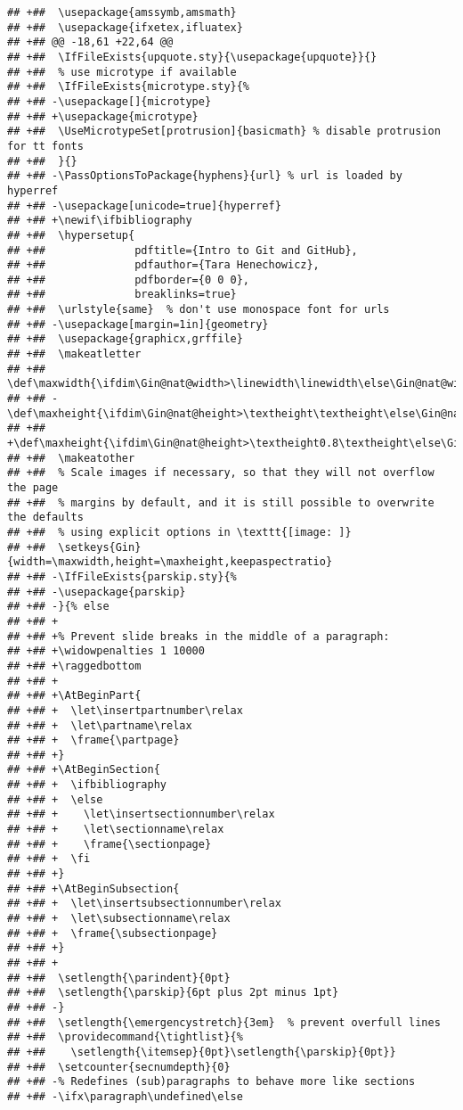 \documentclass[ignorenonframetext,]{beamer}
\newif\ifbibliography
\let\insertpartnumber\relax
\let\partname\relax
\let\insertsectionnumber\relax
\let\sectionname\relax
\let\insertsubsectionnumber\relax
\let\subsectionname\relax
\providecommand{\tightlist}{%
  \setlength{\itemsep}{0pt}\setlength{\parskip}{0pt}}
\begin{document}
\begin{verbatim}
## +##  \usepackage{amssymb,amsmath}
## +##  \usepackage{ifxetex,ifluatex}
## +## @@ -18,61 +22,64 @@
## +##  \IfFileExists{upquote.sty}{\usepackage{upquote}}{}
## +##  % use microtype if available
## +##  \IfFileExists{microtype.sty}{%
## +## -\usepackage[]{microtype}
## +## +\usepackage{microtype}
## +##  \UseMicrotypeSet[protrusion]{basicmath} % disable protrusion for tt fonts
## +##  }{}
## +## -\PassOptionsToPackage{hyphens}{url} % url is loaded by hyperref
## +## -\usepackage[unicode=true]{hyperref}
## +## +\newif\ifbibliography
## +##  \hypersetup{
## +##              pdftitle={Intro to Git and GitHub},
## +##              pdfauthor={Tara Henechowicz},
## +##              pdfborder={0 0 0},
## +##              breaklinks=true}
## +##  \urlstyle{same}  % don't use monospace font for urls
## +## -\usepackage[margin=1in]{geometry}
## +##  \usepackage{graphicx,grffile}
## +##  \makeatletter
## +##  \def\maxwidth{\ifdim\Gin@nat@width>\linewidth\linewidth\else\Gin@nat@width\fi}
## +## -\def\maxheight{\ifdim\Gin@nat@height>\textheight\textheight\else\Gin@nat@height\fi}
## +## +\def\maxheight{\ifdim\Gin@nat@height>\textheight0.8\textheight\else\Gin@nat@height\fi}
## +##  \makeatother
## +##  % Scale images if necessary, so that they will not overflow the page
## +##  % margins by default, and it is still possible to overwrite the defaults
## +##  % using explicit options in \texttt{[image: ]}
## +##  \setkeys{Gin}{width=\maxwidth,height=\maxheight,keepaspectratio}
## +## -\IfFileExists{parskip.sty}{%
## +## -\usepackage{parskip}
## +## -}{% else
## +## +
## +## +% Prevent slide breaks in the middle of a paragraph:
## +## +\widowpenalties 1 10000
## +## +\raggedbottom
## +## +
## +## +\AtBeginPart{
## +## +  \let\insertpartnumber\relax
## +## +  \let\partname\relax
## +## +  \frame{\partpage}
## +## +}
## +## +\AtBeginSection{
## +## +  \ifbibliography
## +## +  \else
## +## +    \let\insertsectionnumber\relax
## +## +    \let\sectionname\relax
## +## +    \frame{\sectionpage}
## +## +  \fi
## +## +}
## +## +\AtBeginSubsection{
## +## +  \let\insertsubsectionnumber\relax
## +## +  \let\subsectionname\relax
## +## +  \frame{\subsectionpage}
## +## +}
## +## +
## +##  \setlength{\parindent}{0pt}
## +##  \setlength{\parskip}{6pt plus 2pt minus 1pt}
## +## -}
## +##  \setlength{\emergencystretch}{3em}  % prevent overfull lines
## +##  \providecommand{\tightlist}{%
## +##    \setlength{\itemsep}{0pt}\setlength{\parskip}{0pt}}
## +##  \setcounter{secnumdepth}{0}
## +## -% Redefines (sub)paragraphs to behave more like sections
## +## -\ifx\paragraph\undefined\else

\end{verbatim}
\end{document}
